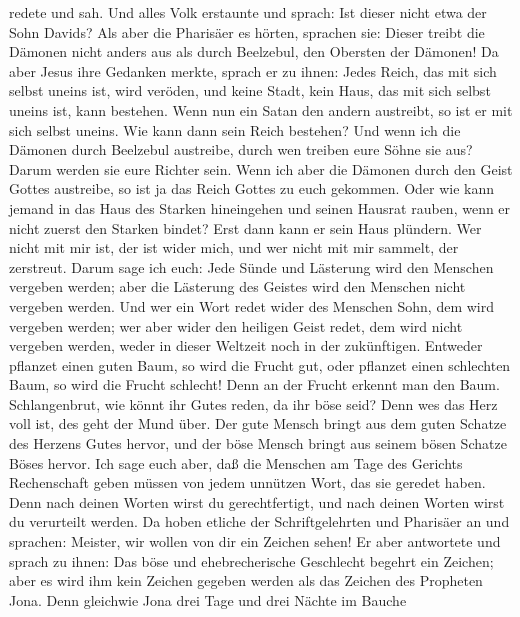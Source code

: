 redete und sah.  Und alles Volk erstaunte und sprach: Ist
dieser nicht etwa der Sohn Davids?  Als aber die
Pharisäer es hörten, sprachen sie: Dieser treibt die Dämonen nicht
anders aus als durch Beelzebul, den Obersten der Dämonen!
 Da aber Jesus ihre Gedanken merkte, sprach er zu ihnen:
Jedes Reich, das mit sich selbst uneins ist, wird veröden, und keine
Stadt, kein Haus, das mit sich selbst uneins ist, kann bestehen.
 Wenn nun ein Satan den andern austreibt, so ist er mit
sich selbst uneins. Wie kann dann sein Reich bestehen? 
Und wenn ich die Dämonen durch Beelzebul austreibe, durch wen treiben
eure Söhne sie aus? Darum werden sie eure Richter sein. 
Wenn ich aber die Dämonen durch den Geist Gottes austreibe, so ist ja
das Reich Gottes zu euch gekommen.  Oder wie kann jemand
in das Haus des Starken hineingehen und seinen Hausrat rauben, wenn er
nicht zuerst den Starken bindet? Erst dann kann er sein Haus plündern.
 Wer nicht mit mir ist, der ist wider mich, und wer nicht
mit mir sammelt, der zerstreut.  Darum sage ich euch:
Jede Sünde und Lästerung wird den Menschen vergeben werden; aber die
Lästerung des Geistes wird den Menschen nicht vergeben werden.
 Und wer ein Wort redet wider des Menschen Sohn, dem wird
vergeben werden; wer aber wider den heiligen Geist redet, dem wird nicht
vergeben werden, weder in dieser Weltzeit noch in der zukünftigen.
 Entweder pflanzet einen guten Baum, so wird die Frucht
gut, oder pflanzet einen schlechten Baum, so wird die Frucht schlecht!
Denn an der Frucht erkennt man den Baum.  Schlangenbrut,
wie könnt ihr Gutes reden, da ihr böse seid? Denn wes das Herz voll ist,
des geht der Mund über.  Der gute Mensch bringt aus dem
guten Schatze des Herzens Gutes hervor, und der böse Mensch bringt aus
seinem bösen Schatze Böses hervor.  Ich sage euch aber,
daß die Menschen am Tage des Gerichts Rechenschaft geben müssen von
jedem unnützen Wort, das sie geredet haben.  Denn nach
deinen Worten wirst du gerechtfertigt, und nach deinen Worten wirst du
verurteilt werden.  Da hoben etliche der Schriftgelehrten
und Pharisäer an und sprachen: Meister, wir wollen von dir ein Zeichen
sehen!  Er aber antwortete und sprach zu ihnen: Das böse
und ehebrecherische Geschlecht begehrt ein Zeichen; aber es wird ihm
kein Zeichen gegeben werden als das Zeichen des Propheten Jona.
 Denn gleichwie Jona drei Tage und drei Nächte im Bauche
